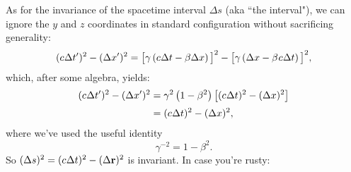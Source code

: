 \documentclass[12pt]{article}
\renewcommand{\vv}[1]{\mathbf{#1}}
\begin{document}
As for the invariance of the spacetime interval $\Delta s$ (aka ``the interval"), we can ignore the $y$ and $z$ coordinates in standard configuration without sacrificing generality:
\begin{equation*}
(c \mkern.5mu \Delta t^{\prime})^2 - (\Delta x^{\prime})^2 = \big[ \gamma \left( c \mkern.5mu \Delta t - \beta \Delta x \right) \big] ^2 - \big[ \gamma \left( \Delta x - \beta \mkern1mu c \mkern.5mu \Delta t \right) \big]^2 ,
\end{equation*}
which, after some algebra, yields:
\begin{equation*}
\begin{aligned}
(c \mkern.5mu \Delta t^{\prime})^2 - (\Delta x^{\prime})^2 &= \gamma^2 \left( 1 - \beta^2 \right) \left[ (c \mkern.5mu \Delta t)^2 - ( \Delta x )^2 \right] \\[2pt]
&= (c \mkern.5mu \Delta t)^2 - ( \Delta x )^2 ,
\end{aligned}
\end{equation*}
where we've used the useful identity
\begin{equation}\label{eq:20}
\gamma^{-2} = 1 - \beta^2 .
\end{equation}
So $(\Delta s)^2 = (c \mkern.5mu \Delta t)^2 - ( \Delta \vv r )^2$ is invariant. In case you're rusty:
\end{document}
